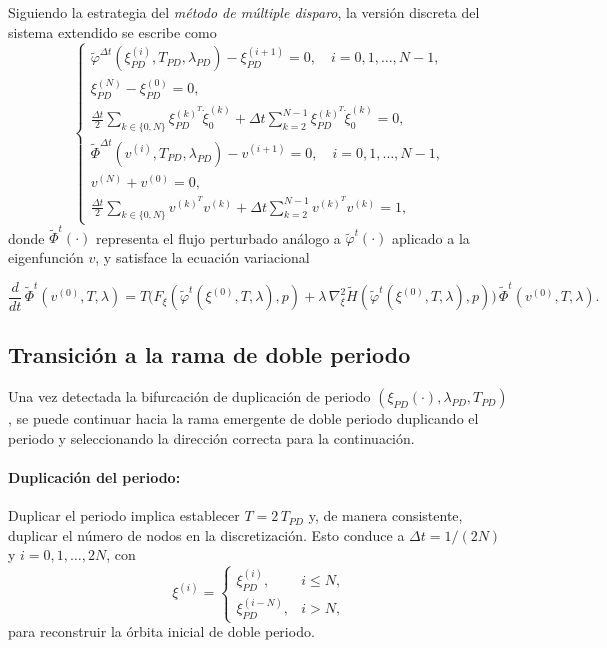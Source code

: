 Siguiendo la estrategia del \emph{método de múltiple disparo}, la versión discreta del sistema extendido se escribe como
\begin{equation}
    \begin{cases}
        \tilde{\varphi}^{\Delta t}(\xi_{PD}^{(i)}, T_{PD}, \lambda_{PD}) - \xi_{PD}^{(i+1)} = 0, \quad i=0,1,\dots,N-1, \\[1mm]
        \xi_{PD}^{(N)} - \xi_{PD}^{(0)} = 0,                                                                            \\[1mm]
        \frac{\Delta t}{2} \sum_{k \in \{0, N\}} \xi_{PD}^{(k)^T} \dot{\xi}_{0}^{(k)}
        + \Delta t \sum_{k=2}^{N-1} \xi_{PD}^{(k)^T} \dot{\xi}_{0}^{(k)} = 0,                                           \\[1mm]
        \tilde{\Phi}^{\Delta t}(v^{(i)}, T_{PD}, \lambda_{PD}) - v^{(i+1)} = 0, \quad i=0,1,\dots,N-1,                  \\[1mm]
        v^{(N)} + v^{(0)} = 0,                                                                                          \\[1mm]
        \frac{\Delta t}{2} \sum_{k \in \{0, N\}} v^{(k)^T} v^{(k)} +
        \Delta t \sum_{k=2}^{N-1} v^{(k)^T} v^{(k)} = 1,
    \end{cases}
    \label{eq:PD_System}
\end{equation}
donde \(\tilde{\Phi}^t(\cdot)\) representa el flujo perturbado análogo a \(\tilde{\varphi}^t(\cdot)\) aplicado a la eigenfunción $v$, y satisface la ecuación variacional

\[
    \dfrac{d}{dt}\, \tilde{\Phi}^{t}(v^{(0)}, T, \lambda)
    = T \Big( F_\xi(\tilde{\varphi}^t(\xi^{(0)}, T, \lambda), p)
    + \lambda \, \nabla^2_\xi \tilde{H}(\tilde{\varphi}^t(\xi^{(0)}, T, \lambda), p) \Big) \,
    \tilde{\Phi}^{t}(v^{(0)}, T, \lambda).
\]

\subsection{Transición a la rama de doble periodo}

Una vez detectada la bifurcación de duplicación de periodo
\((\xi_{PD}(\cdot), \lambda_{PD}, T_{PD})\), se puede continuar hacia la rama emergente de doble periodo
duplicando el periodo y seleccionando la dirección correcta para la continuación.

\paragraph{Duplicación del periodo:}
Duplicar el periodo implica establecer \(T = 2\,T_{PD}\) y, de manera consistente, duplicar el número de nodos en la discretización.
Esto conduce a \(\Delta t = 1/(2N)\) y \(i = 0, 1, \dots, 2N\), con
\begin{equation}
    \xi^{(i)} =
    \begin{cases}
        \xi_{PD}^{(i)} ,  & i \leq N, \\[1mm]
        \xi_{PD}^{(i-N)}, & i > N,
    \end{cases}
    \label{eq:doubling_nodes}
\end{equation}
para reconstruir la órbita inicial de doble periodo.

